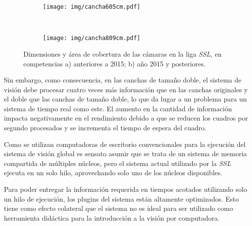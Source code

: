 \begin{figure}[!h]

	\centering

	\begin{subfigure}[c]{0.45\textwidth}
		\centering
		\texttt{[image: img/cancha605cm.pdf]}
		\caption{}
	\end{subfigure}
	~
	\begin{subfigure}[c]{0.45\textwidth}
		\centering
		\texttt{[image: img/cancha809cm.pdf]}
		\caption{}
	\end{subfigure}

	\caption{Dimensiones y área de cobertura de las cámaras en la liga
	\emph{SSL}, en competencias a) anteriores a 2015; b) año 2015 y
	posteriores.}

	\label{cancha}

\end{figure}

Sin embargo, como consecuencia, en las canchas de tamaño doble, el sistema de
visión debe procesar cuatro veces más información que en las canchas
originales y el doble que las canchas de tamaño doble, lo que da lugar a un
problema para un sistema de tiempo real como este. El aumento en la cantidad
de información impacta negativamente en el rendimiento debido a que se reducen
los cuadros por segundo procesados y se incrementa el tiempo de espera del
cuadro.

Como se utilizan computadoras de escritorio convencionales para la ejecución
del sistema de visión global es sensato asumir que se trata de un sistema de
memoria compartida de múltiples núcleos, pero el sistema actual utilizado por la
\emph{SSL} ejecuta en un solo hilo, aprovechando solo uno de los núcleos
disponibles.

Para poder entregar la información requerida en tiempos acotados utilizando solo
un hilo de ejecución, los plugins del sistema están altamente optimizados. Esto
tiene como efecto colateral que el sistema no es ideal para ser utilizado como
herramienta didáctica para la introducción a la visión por computadora.
